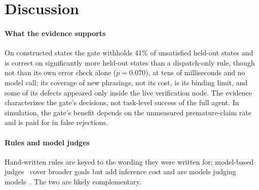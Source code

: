 \section{Discussion}
\label{sec:discussion}

\paragraph{What the evidence supports} On constructed states the gate withholds 41\% of unsatisfied held-out states and is correct on significantly more held-out states than a dispatch-only rule, though not than its own error check alone ($p=0.070$), at tens of milliseconds and no model call; its coverage of new phrasings, not its cost, is its binding limit, and some of its defects appeared only inside the live verification node. The evidence characterizes the gate's decisions, not task-level success of the full agent. In simulation, the gate's benefit depends on the unmeasured premature-claim rate and is paid for in false rejections.

\paragraph{Rules and model judges} Hand-written rules are keyed to the wording they were written for; model-based judges~\cite{pan2024autonomous,sumyk2025done} cover broader goals but add inference cost and are models judging models~\cite{huang2024cannot}. The two are likely complementary.
